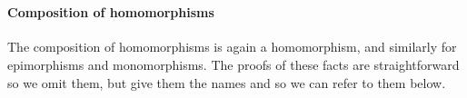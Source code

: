 \begin{code}
\AgdaSpace{}%
\AgdaSpace{}%
\AgdaFunction{]}\AgdaSpace{}%
\AgdaSpace{}%
\AgdaSpace{}%
\AgdaSpace{}%
\<%
\\
%
\>[1]\AgdaSpace{}%
\AgdaSymbol{(}\AgdaSpace{}%
\AgdaOperator{\AgdaInductiveConstructor{,}}\AgdaSpace{}%
\AgdaSymbol{)}\AgdaSpace{}%
\AgdaSymbol{=}\AgdaSpace{}%
\AgdaSymbol{(}\AgdaSpace{}%
\AgdaOperator{\AgdaInductiveConstructor{,}}\AgdaSpace{}%
\AgdaSpace{}%
\AgdaSymbol{)}\AgdaSpace{}%
\AgdaOperator{\AgdaInductiveConstructor{,}}\AgdaSpace{}%
\AgdaSpace{}%
\<%
\end{code}

\paragraph*{Composition of homomorphisms}
\fi      %
The composition of homomorphisms is again a homomorphism, and similarly for epimorphisms and monomorphisms.
\ifshort
The proofs of these facts are straightforward so we omit them, but give them the names
 and  so we can refer to them below.
\else

